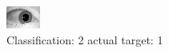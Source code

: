 \begin{figure}[h!]
\begin{center}
\includegraphics[width=0.60\columnwidth]{figures/ID1553_class_2_target_1.png}
\end{center}
\caption{ Classification: 2 actual target: 1}
\label{fig:ID1553_class_2_target_1}
\end{figure}

